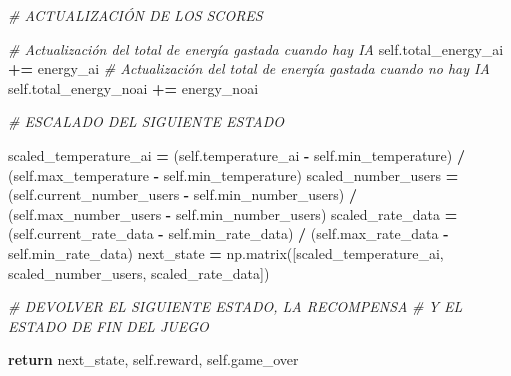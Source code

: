 \documentclass[
]{book}
\newenvironment{Shaded}{\begin{snugshade}}{\end{snugshade}}
\newcommand{\CommentTok}[1]{\textcolor[rgb]{0.56,0.35,0.01}{\textit{#1}}}
\newcommand{\ControlFlowTok}[1]{\textcolor[rgb]{0.13,0.29,0.53}{\textbf{#1}}}
\newcommand{\NormalTok}[1]{#1}
\newcommand{\OperatorTok}[1]{\textcolor[rgb]{0.81,0.36,0.00}{\textbf{#1}}}
\newcommand{\VariableTok}[1]{\textcolor[rgb]{0.00,0.00,0.00}{#1}}
\begin{document}
\begin{Shaded}
\begin{Highlighting}[]
        \CommentTok{\# ACTUALIZACIÓN DE LOS SCORES}
        
        \CommentTok{\# Actualización del total de energía gastada cuando hay IA}
        \VariableTok{self}\NormalTok{.total\_energy\_ai }\OperatorTok{+=}\NormalTok{ energy\_ai}
        \CommentTok{\# Actualización del total de energía gastada cuando no hay IA}
        \VariableTok{self}\NormalTok{.total\_energy\_noai }\OperatorTok{+=}\NormalTok{ energy\_noai}
        
        \CommentTok{\# ESCALADO DEL SIGUIENTE ESTADO}
        
\NormalTok{        scaled\_temperature\_ai }\OperatorTok{=}\NormalTok{ (}\VariableTok{self}\NormalTok{.temperature\_ai }\OperatorTok{{-}} \VariableTok{self}\NormalTok{.min\_temperature)}
                                \OperatorTok{/}\NormalTok{ (}\VariableTok{self}\NormalTok{.max\_temperature }\OperatorTok{{-}} \VariableTok{self}\NormalTok{.min\_temperature)}
\NormalTok{        scaled\_number\_users }\OperatorTok{=}\NormalTok{ (}\VariableTok{self}\NormalTok{.current\_number\_users }\OperatorTok{{-}} \VariableTok{self}\NormalTok{.min\_number\_users)}
                              \OperatorTok{/}\NormalTok{ (}\VariableTok{self}\NormalTok{.max\_number\_users }\OperatorTok{{-}} \VariableTok{self}\NormalTok{.min\_number\_users)}
\NormalTok{        scaled\_rate\_data }\OperatorTok{=}\NormalTok{ (}\VariableTok{self}\NormalTok{.current\_rate\_data }\OperatorTok{{-}} \VariableTok{self}\NormalTok{.min\_rate\_data)}
                           \OperatorTok{/}\NormalTok{ (}\VariableTok{self}\NormalTok{.max\_rate\_data }\OperatorTok{{-}} \VariableTok{self}\NormalTok{.min\_rate\_data)}
\NormalTok{        next\_state }\OperatorTok{=}\NormalTok{ np.matrix([scaled\_temperature\_ai,}
\NormalTok{                                scaled\_number\_users,}
\NormalTok{                                scaled\_rate\_data])}
        
        \CommentTok{\# DEVOLVER EL SIGUIENTE ESTADO, LA RECOMPENSA }
        \CommentTok{\# Y EL ESTADO DE FIN DEL JUEGO}
        
        \ControlFlowTok{return}\NormalTok{ next\_state, }\VariableTok{self}\NormalTok{.reward, }\VariableTok{self}\NormalTok{.game\_over}
\end{Highlighting}
\end{Shaded}
\end{document}
